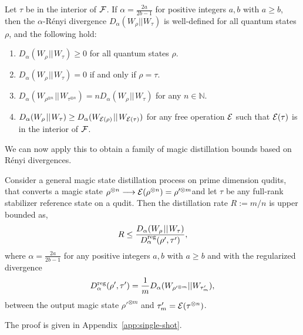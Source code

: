 \documentclass[pra,
aps,
twocolumn,
superscriptaddress,
groupedaddress,
nofootinbib,
reprint
]{revtex4-1}
\begin{document}
\begin{theorem}\label{thm:Da_props} 
	Let $\tau$ be in the interior of ${\mathcal F}$. 
	If $\alpha = \frac{2a}{2b-1}$ for positive integers $a,b$ with $a \geq b$, then the $\alpha$-R\'{e}nyi divergence $D_\alpha(W_\rho || W_\tau)$ is well-defined for all quantum states $\rho$, and the following hold:
\begin{enumerate}
\item $D_\alpha(W_\rho \hspace{1pt}||\hspace{1pt} W_\tau) \ge 0$ for all quantum states $\rho$.
\item  $D_\alpha(W_\rho \hspace{1pt}||\hspace{1pt} W_\tau) = 0$ if and only if $\rho =\tau$.
\item $D_\alpha(W_{\rho^{\otimes n}} \hspace{1pt}||\hspace{1pt} W_{\tau^{\otimes n}}) = n D_\alpha(W_\rho \hspace{1pt}||\hspace{1pt} W_\tau)$ for any $n \in \mathbb{N}$.
\item $D_\alpha(W_\rho \hspace{1pt}||\hspace{1pt} W_\tau) \geq D_\alpha (W_{{\mathcal E}(\rho)} \hspace{1pt}||\hspace{1pt} W_{{\mathcal E}(\tau)})$ for any free operation ${\mathcal E}$ such that ${\mathcal E}(\tau)$ is in the interior of ${\mathcal F}$.
\end{enumerate}
\end{theorem}

We can now apply this to obtain a family of magic distillation bounds based on R\'{e}nyi divergences.
\begin{theorem}
	Consider a general magic state distillation process on prime dimension qudits, that converts a magic state $\rho^{\otimes n} \longrightarrow {\mathcal E}(\rho^{\otimes n})=\rho'^{\otimes m}$and let $\tau$ be any full-rank stabilizer reference state on a qudit. Then the distillation rate $R := m/n$ is upper bounded as,
	\begin{equation}
		R \leq \frac{D_{\alpha}(W_\rho \hspace{1pt}||\hspace{1pt} W_\tau)}{D^{\rm reg}_\alpha( \rho', \tau')},
	\end{equation}
	where $\alpha = \frac{2a}{2b-1}$ for any positive integers $a,b$ with $a \geq b$ and with the regularized divergence
	\begin{equation}
D^{\rm reg}_\alpha( \rho', \tau') = \frac{1}{m} D_\alpha (W_{\rho'^{\otimes m}} || W_{\tau'_m}),
\end{equation}
between the output magic state $\rho'^{\otimes m}$ and $\tau'_m = {\mathcal E}(\tau^{\otimes n})$.
\end{theorem}
The proof is given in Appendix~\ref{app:single-shot}. 
\end{document}
